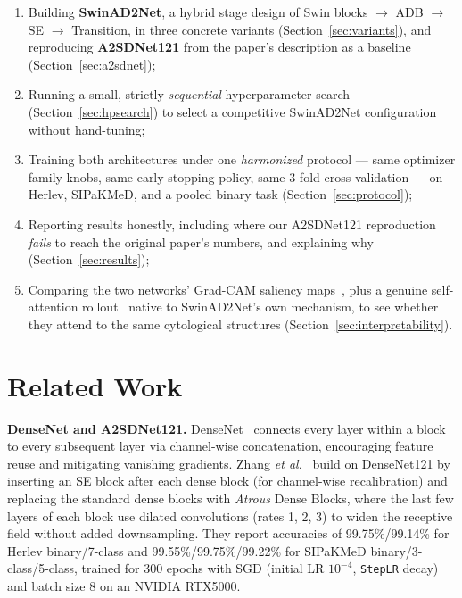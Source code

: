 \documentclass[10pt,twocolumn]{article}
\newcommand{\code}[1]{\texttt{\small #1}}
\begin{document}
\begin{enumerate}[leftmargin=*,itemsep=1pt,topsep=2pt]
    \item Building \textbf{SwinAD2Net}, a hybrid stage design of Swin blocks $\rightarrow$ ADB $\rightarrow$ SE $\rightarrow$ Transition, in three concrete variants (Section~\ref{sec:variants}), and reproducing \textbf{A2SDNet121} from the paper's description as a baseline (Section~\ref{sec:a2sdnet});
    \item Running a small, strictly \emph{sequential} hyperparameter search (Section~\ref{sec:hpsearch}) to select a competitive SwinAD2Net configuration without hand-tuning;
    \item Training both architectures under one \emph{harmonized} protocol --- same optimizer family knobs, same early-stopping policy, same 3-fold cross-validation --- on Herlev, SIPaKMeD, and a pooled binary task (Section~\ref{sec:protocol});
    \item Reporting results honestly, including where our A2SDNet121 reproduction \emph{fails} to reach the original paper's numbers, and explaining why (Section~\ref{sec:results});
    \item Comparing the two networks' Grad-CAM saliency maps~\cite{selvaraju2017}, plus a genuine self-attention rollout~\cite{abnar2020} native to SwinAD2Net's own mechanism, to see whether they attend to the same cytological structures (Section~\ref{sec:interpretability}).
\end{enumerate}

\section{Related Work}

\textbf{DenseNet and A2SDNet121.} DenseNet~\cite{huang2016densenet} connects every layer within a block to every subsequent layer via channel-wise concatenation, encouraging feature reuse and mitigating vanishing gradients. Zhang \emph{et al.}~\cite{zhang2025} build on DenseNet121 by inserting an SE block after each dense block (for channel-wise recalibration) and replacing the standard dense blocks with \emph{Atrous} Dense Blocks, where the last few layers of each block use dilated convolutions (rates 1, 2, 3) to widen the receptive field without added downsampling. They report accuracies of 99.75\%/99.14\% for Herlev binary/7-class and 99.55\%/99.75\%/99.22\% for SIPaKMeD binary/3-class/5-class, trained for 300 epochs with SGD (initial LR $10^{-4}$, \code{StepLR} decay) and batch size 8 on an NVIDIA RTX5000.
\end{document}
